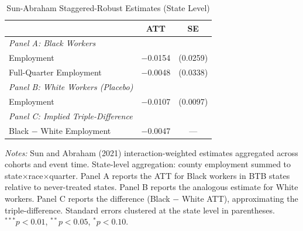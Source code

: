 \begin{table}[htbp]
\centering
\caption{Sun-Abraham Staggered-Robust Estimates (State Level)}
\label{tab:csdid}
\begin{tabular}{lcc}
\hline\hline
 & ATT & SE \\
\hline
\textit{Panel A: Black Workers} & & \\
\quad Employment & $-$0.0154 & (0.0259) \\
\quad Full-Quarter Employment & $-$0.0048 & (0.0338) \\
\hline
\textit{Panel B: White Workers (Placebo)} & & \\
\quad Employment & $-$0.0107 & (0.0097) \\
\hline
\textit{Panel C: Implied Triple-Difference} & & \\
\quad Black $-$ White Employment & $-$0.0047 & --- \\
\hline\hline
\end{tabular}
\begin{tablenotes}[flushleft]\footnotesize
\item \textit{Notes:} Sun and Abraham (2021) interaction-weighted estimates aggregated across cohorts and event time. State-level aggregation: county employment summed to state$\times$race$\times$quarter. Panel A reports the ATT for Black workers in BTB states relative to never-treated states. Panel B reports the analogous estimate for White workers. Panel C reports the difference (Black $-$ White ATT), approximating the triple-difference. Standard errors clustered at the state level in parentheses. $^{***}p<0.01$, $^{**}p<0.05$, $^{*}p<0.10$.
\end{tablenotes}
\end{table}
